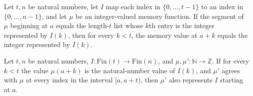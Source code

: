 \begin{theorem}
\label{Light.vecAt_of_seg}
\leanok
{}
Let $t,n$ be natural numbers, let $I$ map each index in $\{0,\ldots,t-1\}$ to an index
in $\{0,\ldots,n-1\}$, and let $\mu$ be an integer-valued memory function. If the
segment of $\mu$ beginning at $a$ equals the length-$t$ list whose $k$th entry is the
integer represented by $I(k)$, then for every $k<t$, the memory value at $a+k$ equals
the integer represented by $I(k)$.
\end{theorem}

\begin{theorem}
\label{Light.VecAt.keep}
\leanok
{}
Let $t,n$ be natural numbers, $I:\mathrm{Fin}(t)\to\mathrm{Fin}(n)$, and $\mu,\mu\prime:\mathbb{N}\to\mathbb{Z}$.
If for every $k<t$ the value $\mu(a+k)$ is the natural-number value of $I(k)$, and
$\mu\prime$ agrees with $\mu$ at every index in the interval $[a,a+t)$, then $\mu\prime$
also represents $I$ starting at $a$.
\end{theorem}
